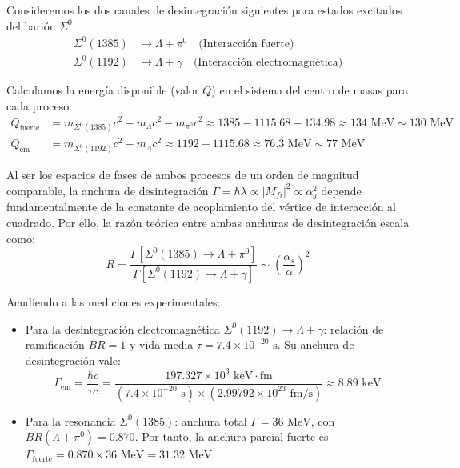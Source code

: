 Consideremos los dos canales de desintegración siguientes para estados excitados del barión $\Sigma^0$:
\begin{align}
    \Sigma^0(1385) &\to \Lambda + \pi^0 \quad \text{(Interacción fuerte)} \\
    \Sigma^0(1192) &\to \Lambda + \gamma \quad \text{(Interacción electromagnética)}
\end{align}

Calculamos la energía disponible (valor $Q$) en el sistema del centro de masas para cada proceso:
\begin{align}
    Q_{\text{fuerte}} &= m_{\Sigma^0(1385)} c^2 - m_\Lambda c^2 - m_{\pi^0} c^2 \approx 1385 - 1115.68 - 134.98 \approx 134 \text{ MeV} \sim 130 \text{ MeV} \\
    Q_{\text{em}} &= m_{\Sigma^0(1192)} c^2 - m_\Lambda c^2 \approx 1192 - 1115.68 \approx 76.3 \text{ MeV} \sim 77 \text{ MeV}
\end{align}

Al ser los espacios de fases de ambos procesos de un orden de magnitud comparable, la anchura de desintegración $\Gamma = \hbar \lambda \propto |M_{fi}|^2 \propto \alpha_g^2$ depende fundamentalmente de la constante de acoplamiento del vértice de interacción al cuadrado. Por ello, la razón teórica entre ambas anchuras de desintegración escala como:
\begin{equation}
    R = \frac{\Gamma[\Sigma^0(1385) \to \Lambda + \pi^0]}{\Gamma[\Sigma^0(1192) \to \Lambda + \gamma]} \sim \left( \frac{\alpha_s}{\alpha} \right)^2
\end{equation}

Acudiendo a las mediciones experimentales:
\begin{itemize}
    \item Para la desintegración electromagnética $\Sigma^0(1192) \to \Lambda + \gamma$: relación de ramificación $BR = 1$ y vida media $\tau = 7.4 \times 10^{-20} \text{ s}$. Su anchura de desintegración vale:
    \begin{equation}
        \Gamma_{\text{em}} = \frac{\hbar c}{\tau c} = \frac{197.327 \times 10^3 \text{ keV}\cdot\text{fm}}{(7.4 \times 10^{-20} \text{ s}) \times (2.99792 \times 10^{23} \text{ fm/s})} \approx 8.89 \text{ keV}
    \end{equation}
    \item Para la resonancia $\Sigma^0(1385)$: anchura total $\Gamma = 36 \text{ MeV}$, con $BR(\Lambda + \pi^0) = 0.870$. Por tanto, la anchura parcial fuerte es $\Gamma_{\text{fuerte}} = 0.870 \times 36 \text{ MeV} = 31.32 \text{ MeV}$.
\end{itemize}

